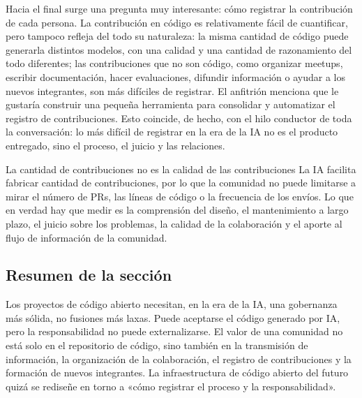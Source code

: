 Hacia el final surge una pregunta muy interesante: cómo registrar la contribución de cada persona. La contribución en código es relativamente fácil de cuantificar, pero tampoco refleja del todo su naturaleza: la misma cantidad de código puede generarla distintos modelos, con una calidad y una cantidad de razonamiento del todo diferentes; las contribuciones que no son código, como organizar meetups, escribir documentación, hacer evaluaciones, difundir información o ayudar a los nuevos integrantes, son más difíciles de registrar. El anfitrión menciona que le gustaría construir una pequeña herramienta para consolidar y automatizar el registro de contribuciones. Esto coincide, de hecho, con el hilo conductor de toda la conversación: lo más difícil de registrar en la era de la IA no es el producto entregado, sino el proceso, el juicio y las relaciones.

\begin{warningbox}{La cantidad de contribuciones no es la calidad de las contribuciones}
La IA facilita fabricar cantidad de contribuciones, por lo que la comunidad no puede limitarse a mirar el número de PRs, las líneas de código o la frecuencia de los envíos. Lo que en verdad hay que medir es la comprensión del diseño, el mantenimiento a largo plazo, el juicio sobre los problemas, la calidad de la colaboración y el aporte al flujo de información de la comunidad.
\end{warningbox}

\subsection{Resumen de la sección}

Los proyectos de código abierto necesitan, en la era de la IA, una gobernanza más sólida, no fusiones más laxas. Puede aceptarse el código generado por IA, pero la responsabilidad no puede externalizarse. El valor de una comunidad no está solo en el repositorio de código, sino también en la transmisión de información, la organización de la colaboración, el registro de contribuciones y la formación de nuevos integrantes. La infraestructura de código abierto del futuro quizá se rediseñe en torno a «cómo registrar el proceso y la responsabilidad».
